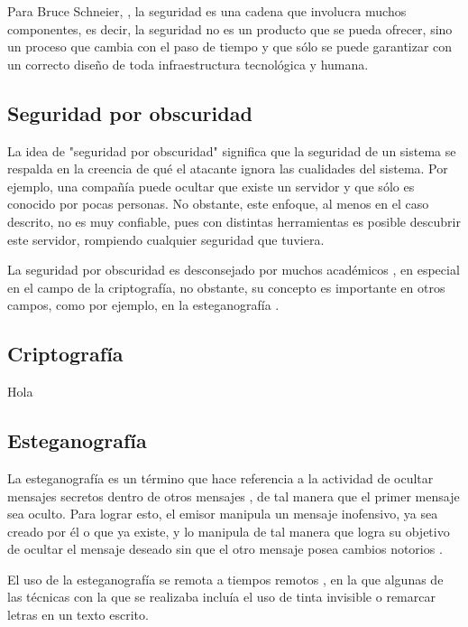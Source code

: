 Para Bruce Schneier, \citet{Secrets_Schneier}, la seguridad es una cadena que 
involucra muchos componentes, es decir, la seguridad no es un producto que se pueda ofrecer, sino un proceso que cambia con el paso de tiempo y que s{\'{o}}lo se puede garantizar con un correcto diseño de toda infraestructura tecnol{\'{o}}gica y humana.

\subsection{Seguridad por obscuridad}

La idea de "seguridad por obscuridad" significa que \citet{Obscurity} la seguridad de un sistema se respalda en la creencia de qu{\'{e}} el atacante ignora las cualidades del sistema. Por ejemplo, una compañ{\'{i}}a puede ocultar que existe un servidor y que s{\'{o}}lo es conocido por pocas personas. No obstante, este enfoque, al menos en el caso descrito, no es muy confiable, pues con distintas herramientas es posible descubrir este servidor, rompiendo cualquier seguridad que tuviera.

La seguridad por obscuridad es desconsejado por muchos 
acad{\'{e}}micos \citet{Obscurity}, en especial en el campo de la 
criptograf{\'{i}}a, no obstante, su concepto es importante en otros 
campos, como por ejemplo, en la esteganograf{\'{i}}a 
\citet{Obscurity_Stegano}.

\subsection{Criptograf{\'{i}}a}

Hola

\subsection{Esteganograf{\'{i}}a}

La esteganograf{\'{i}}a es un t{\'{e}}rmino que hace referencia a la 
actividad de ocultar mensajes secretos dentro de otros mensajes 
\citet{AC_Schneier} , de tal manera que el primer mensaje sea oculto. Para lograr esto, el emisor manipula un mensaje inofensivo, ya sea creado por {\'{e}}l o que ya existe, y lo manipula de tal manera que logra su objetivo de ocultar el mensaje deseado sin que el otro mensaje posea cambios notorios .

El uso de la esteganograf{\'{i}}a se remota a tiempos remotos 
\citet{AC_Schneier}, en la que algunas de las t{\'{e}}cnicas con la que se realizaba inclu{\'{i}}a el uso de tinta invisible o remarcar letras en un texto escrito.


